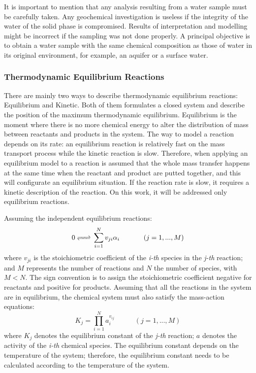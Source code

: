 \documentclass[ppgc,mestrado,english]{iiufrgs}
\begin{document}
It is important to mention that any analysis resulting from a water sample must be carefully taken. Any geochemical investigation is useless if the integrity of the water of the solid phase is compromised. Results of interpretation and modelling might be incorrect if the sampling was not done properly. A principal objective is to obtain a water sample with the same chemical composition as those of water in its original environment, for example, an aquifer or a surface water. \cite{Deutsch:97}

\subsubsection{Thermodynamic Equilibrium Reactions}
There are mainly two ways to describe thermodynamic equilibrium reactions: Equilibrium and Kinetic. Both of them formulates a closed system and describe the position of the maximum thermodynamic equilibrium. Equilibrium is the moment where there is no more chemical energy to alter the distribution of mass between reactants and products in the system. The way to model a reaction depends on its rate: an equilibrium reaction is relatively fast on the mass transport process while the kinetic reaction is slow. Therefore, when applying an equilibrium model to a reaction is assumed that the whole mass transfer happens at the same time when the reactant and product are putted together, and this will configurate an equilibrium situation. If the reaction rate is slow, it requires a kinetic description of the reaction. On this work, it will be addressed only equilibrium reactions.  \cite{Nordstrom:86}

Assuming the independent equilibrium reactions:
\begin{equation}\label{reaction}
0 \ce{<=>} \sum\limits_{i=1}^N  v_{ji} \alpha_i \hspace{35pt}    (j = 1, ... , M)
\end{equation}
where $v_{ji}$ is the stoichiometric coefficient of the \emph{i-th} species in the \emph{j-th} reaction; and $M$ represents the number of reactions and $N$ the number of species, with $M < N$. The sign convention is to assign the stoichiometric coefficient negative for reactants and positive for products. Assuming that all the reactions in the system are in equilibrium, the chemical system must also satisfy the mass-action equations:
\begin{equation}\label{eq:massaction}
K_j =  \prod\limits_{i=1}^N  a_i^{v_{ij}} \hspace{35pt}    (j = 1, ... , M)
\end{equation}
where $K_j$ denotes the equilibrium constant of the \emph{j-th} reaction; $a$ denotes the activity of the \emph{i-th} chemical species. The equilibrium constant depends on the temperature of the system; therefore, the equilibrium constant needs to be calculated according to the temperature of the system. 
\end{document}
